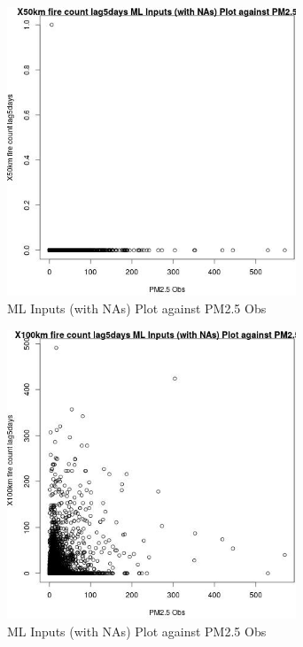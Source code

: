 \begin{figure} 
\centering  
\includegraphics[width=0.77\textwidth]{Code_Outputs/Report_ML_input_PM25_Step4_part_e_de_duplicated_aves_compiled_2019-05-14wNAs_X50km_fire_count_lag5daysvPM25_Obs.jpg} 
\caption{\label{fig:Report_ML_input_PM25_Step4_part_e_de_duplicated_aves_compiled_2019-05-14wNAsX50km_fire_count_lag5daysvPM25_Obs}ML Inputs (with NAs) Plot against PM2.5 Obs} 
\end{figure} 
 

\begin{figure} 
\centering  
\includegraphics[width=0.77\textwidth]{Code_Outputs/Report_ML_input_PM25_Step4_part_e_de_duplicated_aves_compiled_2019-05-14wNAs_X100km_fire_count_lag5daysvPM25_Obs.jpg} 
\caption{\label{fig:Report_ML_input_PM25_Step4_part_e_de_duplicated_aves_compiled_2019-05-14wNAsX100km_fire_count_lag5daysvPM25_Obs}ML Inputs (with NAs) Plot against PM2.5 Obs} 
\end{figure} 
 

